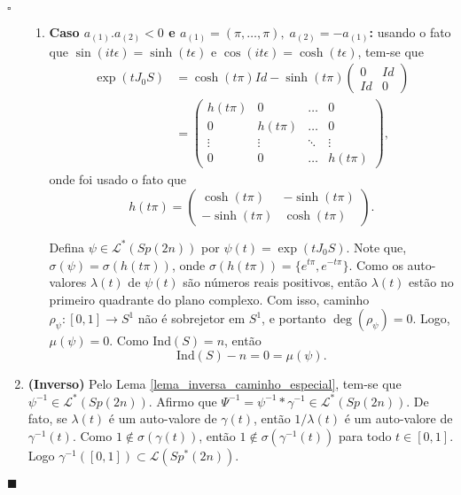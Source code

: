 \documentclass[12pt]{book}
\newenvironment{prova}[1]{$\square$ #1}{\hfill$\blacksquare$}
\newcommand{\caminhosespeciais}[1]{\mathcal{L}^{*}(#1)}
\newcommand{\caminhos}{\mathcal{L}}
\newcommand{\circulo}{S^{1}}
\newcommand{\espectrooperador}[1]{\sigma(#1)}
\newcommand{\estruturacomplexa}{J_{0}}
\newcommand{\gruposimpletico}[1]{Sp(#1)}
\newcommand{\gruposimpleticonaodegenerado}[1]{Sp^{#1}(2n)}
\newcommand{\ind}{\text{Ind}}
\newcommand{\intervalo}{[0,1]}
\begin{document}
\begin{prova}
\begin{enumerate}
\begin{enumerate}
				\item \textbf{Caso $a_{(1)}.a_{(2)}<0$ e $a_{(1)}=(\pi,\dots,\pi), \; a_{(2)} = -a_{(1)}$:} usando o fato que $\sin(it\epsilon)=\sinh(t\epsilon)$ e $\cos(it\epsilon)=\cosh(t\epsilon)$, tem-se que
				$$
				\begin{aligned}
					\exp(t\estruturacomplexa S) 
					&= \cosh(t\pi)Id- \sinh(t\pi)\left(
					\begin{array}{cc}
					0 & Id
					\\
					Id & 0  
					\end{array}
					\right)
					\\
					&=	
					\left(
					\begin{array}{ccccc}
					h(t\pi) & 0 &\dots & 0 
					\\
					0 & h(t\pi) &\dots & 0 
					\\
					\vdots & \vdots & \ddots & \vdots 
					\\
					0 & 0 & \dots & h(t\pi)
					\end{array}
					\right),
				\end{aligned}
				$$
				onde foi usado o fato que 
				$$
				h(t\pi) = 
				\left(
				\begin{array}{cc}
				\cosh(t\pi) & -\sinh(t\pi)
				\\
				-\sinh(t\pi) & \cosh(t\pi)
				\end{array}
				\right).
				$$
				
				Defina $\psi \in \caminhosespeciais{\gruposimpletico{2n}}$ por $\psi(t) = \exp(t\estruturacomplexa S)$. Note que, $\espectrooperador{\psi}= \espectrooperador{h(t\pi)} $, onde $\espectrooperador{h(t\pi)} = \{e^{t\pi} , e^{-t\pi}\}$. Como os auto-valores $\lambda(t)$ de $\psi(t)$ são números reais positivos, então $\lambda(t)$ estão no primeiro quadrante do plano complexo. Com isso, caminho $\rho_{\psi}:\intervalo\to \circulo$ não é sobrejetor em $\circulo$, e portanto $\deg(\rho_{\psi}) = 0$. Logo, $\mu(\psi) = 0$. Como $\ind(S) = n$, então
				$$
				\ind(S) - n = 0 =\mu(\psi).
				$$
			
			\end{enumerate}
	
			\item \textbf{(Inverso)} Pelo Lema \ref{lema_inversa_caminho_especial}, tem-se que $\psi^{-1} \in \caminhosespeciais{\gruposimpletico{2n}}$. Afirmo que $\Psi^{-1}= \psi^{-1}*\gamma^{-1} \in \caminhosespeciais{\gruposimpletico{2n}}$. De fato, se $\lambda(t)$ é um auto-valore de $\gamma(t)$, então $1/\lambda(t)$ é um auto-valore de $\gamma^{-1}(t)$. Como $1 \notin\espectrooperador{\gamma(t)}$, então $1 \notin\espectrooperador{\gamma^{-1}(t)}$
			para todo $t\in \intervalo$. Logo $\gamma^{-1}(\intervalo)\subset\caminhos(\gruposimpleticonaodegenerado{*})$. 
			

\end{enumerate}
\end{prova}
\end{document}
